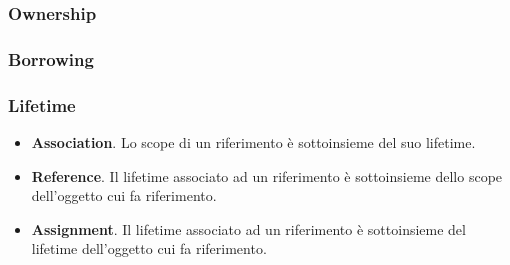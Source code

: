 \documentclass{beamer}
\newcommand{\textcode}[1]{\colorbox{backcolour}{\texttt{#1}}}
\begin{document}

\begin{frame}
    \frametitle{Ownership}
    
\end{frame}


\begin{frame}
    \frametitle{Borrowing}
    
\end{frame}

    

\begin{frame}
    \frametitle{Lifetime}
    \begin{itemize}
        \item \textbf{Association}. Lo scope di un riferimento è sottoinsieme del suo lifetime. 
        \item \textbf{Reference}. Il lifetime associato ad un riferimento è sottoinsieme dello scope dell'oggetto cui fa riferimento.  
        \item \textbf{Assignment}. Il lifetime associato ad un riferimento è sottoinsieme del lifetime dell'oggetto cui fa riferimento.
    \end{itemize}
\end{frame}
\end{document}
